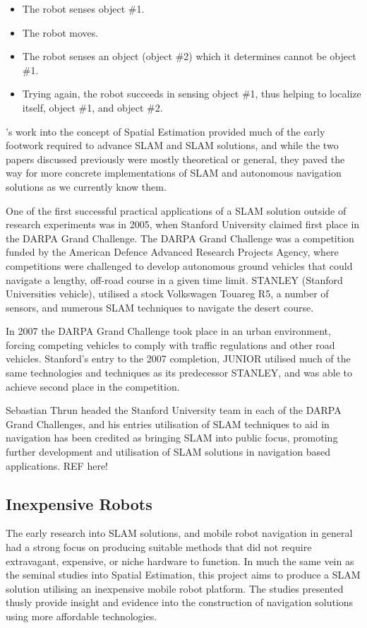 \begin{itemize}
    \item The robot senses object \#1.
    \item The robot moves. 
    \item The robot senses an object (object \#2) which it determines cannot be
    object \#1.
    \item Trying again, the robot succeeds in sensing object \#1, thus helping
    to localize itself, object \#1, and object \#2.
\end{itemize}

\citeauthor*{Smith1988}'s work into the concept of Spatial Estimation
provided much of the early footwork required to advance SLAM and SLAM
solutions, and while the two papers discussed previously were mostly
theoretical or general, they paved the way for more concrete implementations
of SLAM and autonomous navigation solutions as we currently know them.

One of the first successful practical applications of a SLAM solution outside of
research experiments was in 2005, when Stanford University claimed first
place in the DARPA Grand Challenge.
The DARPA Grand Challenge was a competition funded by the American Defence
Advanced Research Projects Agency, where competitions were challenged to
develop autonomous ground vehicles that could navigate a lengthy, off-road
course in a given time limit. 
STANLEY (Stanford Universities vehicle), utilised a stock Volkswagen
Touareg R5, a number of sensors, and numerous SLAM techniques to navigate the
desert course.

In 2007 the DARPA Grand Challenge took place in an urban environment, forcing
competing vehicles to comply with traffic regulations and other road vehicles.
Stanford's entry to the 2007 completion, JUNIOR utilised much of the same
technologies and techniques as its predecessor STANLEY, and was able to achieve
second place in the competition.

Sebastian Thrun headed the Stanford University team in each of the DARPA Grand
Challenges, and his entries utilisation of SLAM techniques to aid in
navigation has been credited as bringing SLAM into public focus, promoting
further development and utilisation of SLAM solutions in navigation based
applications. REF here!


\subsection{Inexpensive Robots}
The early research into SLAM solutions, and mobile robot navigation in general
had a strong focus on producing suitable methods that did not require
extravagant, expensive, or niche hardware to function.
In much the same vein as the seminal studies into Spatial Estimation, this
project aims to produce a SLAM solution utilising an inexpensive mobile
robot platform.
The studies presented thusly provide insight and evidence into the
construction of navigation solutions using more affordable technologies.

